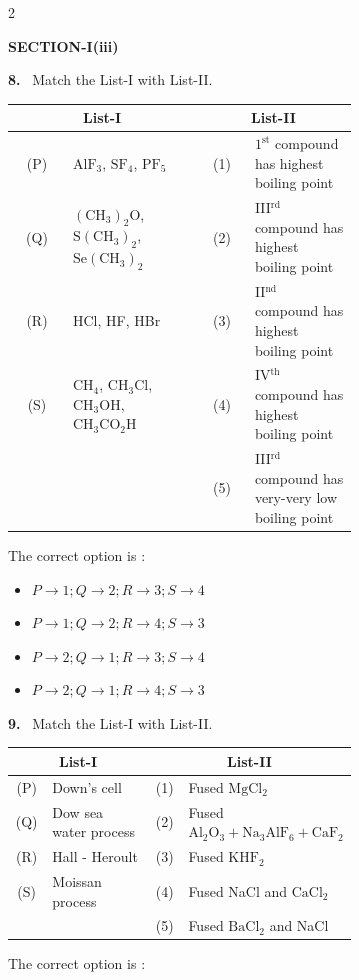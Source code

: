 \documentclass[10pt]{extarticle}
\newcommand{\sect}[1]{\par\smallskip\noindent\textbf{#1}\par}
\newcommand{\qn}[1]{\par\smallskip\noindent\textbf{#1.}~}
\newenvironment{qoptions}{\begin{itemize}[leftmargin=1.8em,itemsep=1pt,topsep=2pt,label={}]}{\end{itemize}}
\newcommand{\opt}[2]{\item[(#1)] #2}
\begin{document}
\begin{multicols}{2}
\sect{SECTION-I(iii)}
\qn{8} Match the List-I with List-II.\par
{\footnotesize\setlength{\tabcolsep}{2pt}\begin{tabular}{|c|p{0.38\linewidth}|c|p{0.3\linewidth}|}
\hline
\multicolumn{2}{|c|}{\textbf{List-I}} & \multicolumn{2}{c|}{\textbf{List-II}}\\ \hline
(P) & $\mathrm{AlF_3}$, $\mathrm{SF_4}$, $\mathrm{PF_5}$ & (1) & $1^{\text{st}}$ compound has highest boiling point\\ \hline
(Q) & $(\mathrm{CH_3})_2\mathrm{O}$, $\mathrm{S(CH_3)_2}$, $\mathrm{Se(CH_3)_2}$ & (2) & III$^{\text{rd}}$ compound has highest boiling point\\ \hline
(R) & HCl, HF, HBr & (3) & II$^{\text{nd}}$ compound has highest boiling point\\ \hline
(S) & $\mathrm{CH_4}$, $\mathrm{CH_3Cl}$, $\mathrm{CH_3OH}$, $\mathrm{CH_3CO_2H}$ & (4) & IV$^{\text{th}}$ compound has highest boiling point\\ \hline
 & & (5) & III$^{\text{rd}}$ compound has very-very low boiling point\\ \hline
\end{tabular}}\par
The correct option is :
\begin{qoptions}
\opt{A}{$P\to1;Q\to2;R\to3;S\to4$}
\opt{B}{$P\to1;Q\to2;R\to4;S\to3$}
\opt{C}{$P\to2;Q\to1;R\to3;S\to4$}
\opt{D}{$P\to2;Q\to1;R\to4;S\to3$}
\end{qoptions}
\qn{9} Match the List-I with List-II.\par
{\footnotesize\setlength{\tabcolsep}{2pt}\begin{tabular}{|c|p{0.3\linewidth}|c|p{0.38\linewidth}|}
\hline
\multicolumn{2}{|c|}{\textbf{List-I}} & \multicolumn{2}{c|}{\textbf{List-II}}\\ \hline
(P) & Down's cell & (1) & Fused $\mathrm{MgCl_2}$\\ \hline
(Q) & Dow sea water process & (2) & Fused $\mathrm{Al_2O_3}+\mathrm{Na_3AlF_6}+\mathrm{CaF_2}$\\ \hline
(R) & Hall - Heroult & (3) & Fused $\mathrm{KHF_2}$\\ \hline
(S) & Moissan process & (4) & Fused NaCl and $\mathrm{CaCl_2}$\\ \hline
 & & (5) & Fused $\mathrm{BaCl_2}$ and NaCl\\ \hline
\end{tabular}}\par
The correct option is :
\begin{qoptions}

\end{qoptions}
\end{multicols}
\end{document}
